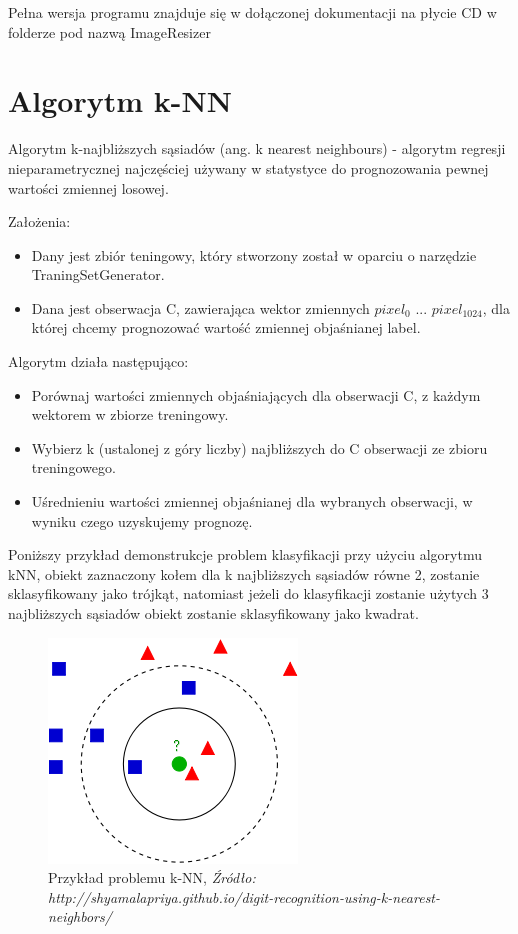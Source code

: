 \documentclass[brudnopis]{xmgr}
\begin{document}
Pełna wersja programu znajduje się w dołączonej dokumentacji na płycie CD w folderze pod nazwą ImageResizer

\section{Algorytm k-NN}

Algorytm k-najbliższych sąsiadów (ang. k nearest neighbours)\cite{2}\cite{11} - algorytm regresji nieparametrycznej najczęściej używany w statystyce do prognozowania pewnej wartości zmiennej losowej.
\newpage

Założenia:
\begin{itemize}
\item
Dany jest zbiór teningowy, który stworzony został w oparciu o narzędzie TraningSetGenerator.
\item
Dana jest obserwacja C, zawierająca wektor zmiennych $pixel_{0}$ ... $pixel_{1024}$, dla której chcemy prognozować wartość zmiennej objaśnianej label.
\end{itemize}	

Algorytm działa następująco:
\begin{itemize}
\item
Porównaj wartości zmiennych objaśniających dla obserwacji C, z każdym wektorem w zbiorze treningowy.
\item
Wybierz k (ustalonej z góry liczby) najbliższych do C obserwacji ze zbioru treningowego.
\item
Uśrednieniu wartości zmiennej objaśnianej dla wybranych obserwacji, w wyniku czego uzyskujemy prognozę.	
\end{itemize}	
     
Poniższy przykład demonstrukcje problem klasyfikacji przy użyciu algorytmu kNN, obiekt zaznaczony kołem dla k najbliższych sąsiadów równe 2, zostanie sklasyfikowany jako trójkąt, natomiast jeżeli do klasyfikacji zostanie użytych 3 najbliższych sąsiadów obiekt zostanie sklasyfikowany jako kwadrat.

\begin{figure}[!tbh]
\centering
\includegraphics[width=.4\hsize]{fig/knn}
\caption{Przykład problemu k-NN, \emph{Źródło: http://shyamalapriya.github.io/digit-recognition-using-k-nearest-neighbors/}}
\end{figure}
\newpage
\end{document}

